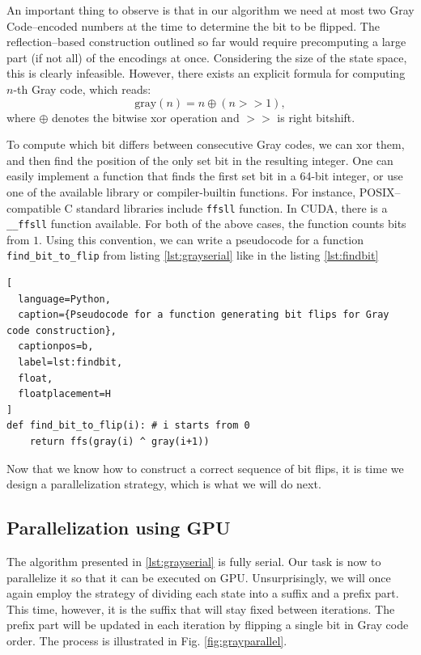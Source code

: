 An important thing to observe is that in our algorithm we need at most two Gray
Code--encoded numbers at the time to determine the bit to be flipped. The
reflection--based construction outlined so far would require precomputing a
large part (if not all) of the encodings at once. Considering the size of the
state space, this is clearly infeasible. However, there exists an explicit
formula for computing $n$-th Gray code, which reads:
\begin{equation}
  \mbox{gray}(n) = n \oplus (n >> 1),
\end{equation}
where $\oplus$ denotes the bitwise xor operation and $>>$ is right bitshift.

To compute which bit differs between consecutive Gray codes, we can xor them,
and then find the position of the only set bit in the resulting integer. One
can easily implement a function that finds the first set bit in a 64-bit
integer, or use one of the available library or compiler-builtin functions. For
instance, POSIX--compatible C standard libraries include \texttt{ffsll}
function. In CUDA, there is a \texttt{\_\_ffsll} function available. For both
of the above cases, the function counts bits from $1$. Using this convention,
we can write a pseudocode for a function \texttt{find\_bit\_to\_flip} from
listing \ref{lst:grayserial} like in the listing \ref{lst:findbit}

\begin{lstlisting}[
  language=Python,
  caption={Pseudocode for a function generating bit flips for Gray code construction},
  captionpos=b,
  label=lst:findbit,
  float,
  floatplacement=H
]
def find_bit_to_flip(i): # i starts from 0
    return ffs(gray(i) ^ gray(i+1))
\end{lstlisting}

Now that we know how to construct a correct sequence of bit flips, it is time
we design a parallelization strategy, which is what we will do next.

\subsection{Parallelization using GPU}
The algorithm presented in \ref{lst:grayserial} is fully serial. Our task is now to
parallelize it so that it can be executed on GPU. Unsurprisingly, we will once
again employ the strategy of dividing each state into a suffix and a prefix
part. This time, however, it is the suffix that will stay fixed between
iterations. The prefix part will be updated in each iteration by flipping a
single bit in Gray code order. The process is illustrated in Fig.
\ref{fig:grayparallel}.

